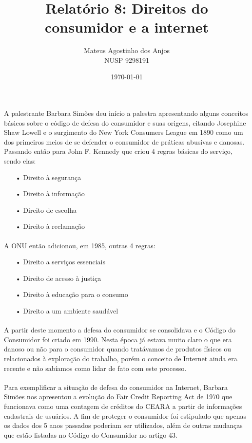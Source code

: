 \documentclass[12pt]{article}
\title{Relatório 8: Direitos do consumidor e a internet}
\author{Mateus Agostinho dos Anjos\\NUSP 9298191}
\date{\today}
\begin{document}
	\maketitle
	\paragraph{}
		A palestrante Barbara Simões deu início a palestra apresentando alguns
		conceitos básicos sobre o código de defesa do consumidor e suas
		origens, citando Josephine Shaw Lowell e o surgimento do New York Consumers 
		League em 1890 como um dos primeiros meios de se defender o consumidor
		de práticas abusivas e danosas. Passando então para John F. Kennedy que
		criou 4 regras básicas do serviço, sendo elas:
		\begin{itemize}
			\item[•]
				Direito à segurança
			\item[•]	
                Direito à informação 
			\item[•]			
				Direito de escolha
			\item[•]				
				 Direito à reclamação
		\end{itemize}
	\paragraph{}
		A ONU então adicionou, em 1985, outras 4 regras:	
		\begin{itemize}
			\item[•]
				Direito a serviços essenciais
			\item[•]	
				Direito de acesso à justiça
			\item[•]			
                Direito à educação para o consumo
			\item[•]				
				 Direito a um ambiente saudável 
		\end{itemize}
	\paragraph{}
		A partir deste momento a defesa do consumidor se consolidava e o Código
		do Consumidor foi criado em 1990. Nesta época já estava muito claro
		o que era danoso ou não para o consumidor quando tratávamos de produtos
		físicos ou relacionados à exploração do trabalho,	porém o conceito de
		Internet ainda era recente e não sabíamos como lidar de fato com este 
		processo.
	\paragraph{}
		Para exemplificar a situação de defesa do consumidor na Internet, 
		Barbara Simões nos apresentou a evolução do Fair Credit Reporting Act
		de 1970 que funcionava como uma contagem de créditos do CEARA a partir
		de informações cadastrais de usuários. A fim de proteger o consumidor foi
		estipulado que apenas os dados dos 5 anos passados poderiam ser utilizados,
		além de outras mudanças que estão listadas no Código do Consumidor no
		artigo 43.
\end{document}
